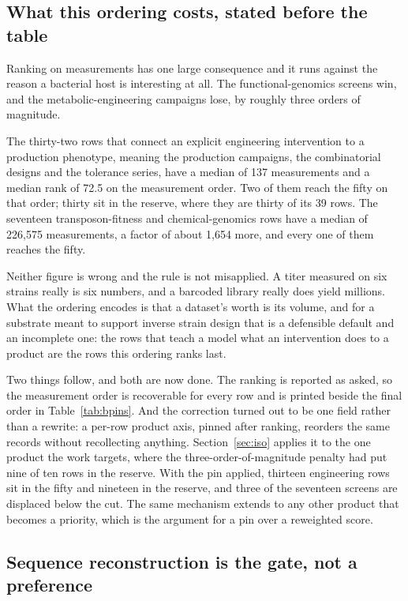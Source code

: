 \subsection{What this ordering costs, stated before the table}\label{sec:cost}

Ranking on measurements has one large consequence and it runs against the reason a
bacterial host is interesting at all. The functional-genomics screens win, and the
metabolic-engineering campaigns lose, by roughly three orders of magnitude.

The thirty-two rows that connect an explicit engineering intervention to a production
phenotype, meaning the production campaigns, the combinatorial designs and the tolerance
series, have a median of 137 measurements and a median rank of 72.5 on the measurement
order. Two of them reach the fifty on that order; thirty sit in the reserve, where they
are thirty of its 39 rows. The seventeen transposon-fitness and chemical-genomics rows
have a median of 226,575 measurements, a factor of about 1,654 more, and every one of
them reaches the fifty.

Neither figure is wrong and the rule is not misapplied. A titer measured on six strains
really is six numbers, and a barcoded library really does yield millions. What the ordering
encodes is that a dataset's worth is its volume, and for a substrate meant to support
inverse strain design that is a defensible default and an incomplete one: the rows that
teach a model what an intervention does to a product are the rows this ordering ranks last.

Two things follow, and both are now done. The ranking is reported as asked, so the
measurement order is recoverable for every row and is printed beside the final order in
Table~\ref{tab:bpins}. And the correction turned out to be one field rather than a
rewrite: a per-row product axis, pinned after ranking, reorders the same records without
recollecting anything. Section~\ref{sec:iso} applies it to the one product the work
targets, where the three-order-of-magnitude penalty had put nine of ten rows in the
reserve. With the pin applied, thirteen engineering rows sit in the fifty and nineteen in
the reserve, and three of the seventeen screens are displaced below the cut. The same
mechanism extends to any other product that becomes a priority, which is the argument for
a pin over a reweighted score.

\subsection{Sequence reconstruction is the gate, not a preference}

